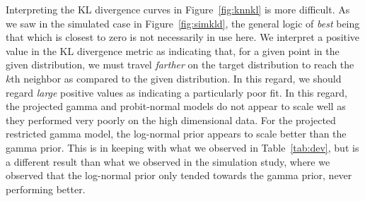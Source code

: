 Interpreting the KL divergence curves in Figure~\ref{fig:knnkl} is more difficult.  As we saw in the
  simulated case in Figure~\ref{fig:simkld}, the general logic of \emph{best} being that which is
  closest to zero is not necessarily in use here.  We interpret a positive value in the KL divergence metric
  as indicating that, for a given point in the given distribution, we must travel \emph{farther} on
  the target distribution to reach the $k$th neighbor as compared to the given distribution.  In this
  regard, we should regard \emph{large} positive values as indicating a particularly poor fit.  In this
  regard, the projected gamma and probit-normal models do not appear to scale well as they performed
  very poorly on the high dimensional data.  For the projected restricted gamma model, the log-normal
  prior appears to scale better than the gamma prior.  This is in keeping with what we observed in
  Table~\ref{tab:dev}, but is a different result than what we observed in the simulation study, where
  we observed that the log-normal prior only tended towards the gamma prior, never performing better.

